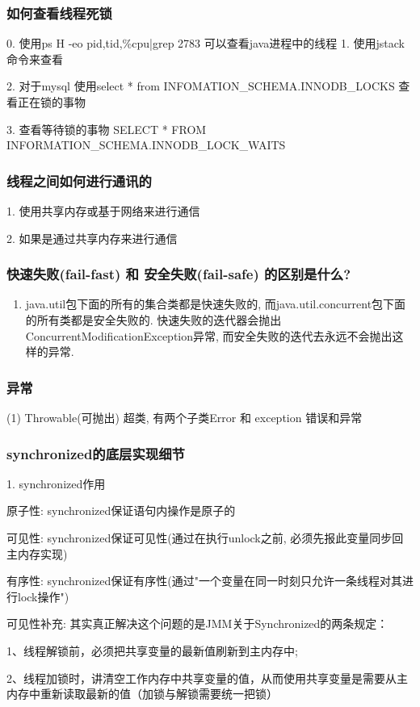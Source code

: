 \subsubsection{如何查看线程死锁}
0. 使用ps H -eo pid,tid,\%cpu|grep 2783 可以查看java进程中的线程
1. 使用jstack命令来查看 \par
2. 对于mysql 使用select * from INFOMATION\_SCHEMA.INNODB\_LOCKS 查看正在锁的事物 \par
3. 查看等待锁的事物 SELECT * FROM INFORMATION\_SCHEMA.INNODB\_LOCK\_WAITS \par
\subsubsection{线程之间如何进行通讯的}
1. 使用共享内存或基于网络来进行通信 \par
2. 如果是通过共享内存来进行通信
\subsubsection{快速失败(fail-fast) 和 安全失败(fail-safe) 的区别是什么?}
\begin{enumerate}
	\item java.util包下面的所有的集合类都是快速失败的, 而java.util.concurrent包下面的所有类都是安全失败的. 快速失败的迭代器会抛出ConcurrentModificationException异常, 而安全失败的迭代去永远不会抛出这样的异常.

\end{enumerate}
\subsubsection{异常}
(1) Throwable(可抛出) 超类, 有两个子类Error 和 exception 错误和异常
\subsubsection{synchronized的底层实现细节}
1. synchronized作用 \par
原子性: synchronized保证语句内操作是原子的 \par
可见性: synchronized保证可见性(通过在执行unlock之前, 必须先报此变量同步回主内存实现) \par
有序性: synchronized保证有序性(通过"一个变量在同一时刻只允许一条线程对其进行lock操作") \par
可见性补充: 	其实真正解决这个问题的是JMM关于Synchronized的两条规定：
\par
1、线程解锁前，必须把共享变量的最新值刷新到主内存中; \par
2、线程加锁时，讲清空工作内存中共享变量的值，从而使用共享变量是需要从主内存中重新读取最新的值（加锁与解锁需要统一把锁） \par
